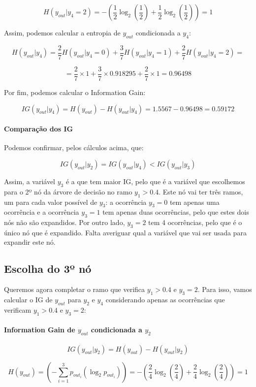 \documentclass{article}
\begin{document}
\[ H(y_{out}|y_4 = 2) = - \left( \frac{1}{2} \log_2 \left( \frac{1}{2} \right) + \frac{1}{2} \log_2 \left( \frac{1}{2} \right) \right) = 1 \]

Assim, podemos calcular a entropia de $y_{out}$ condicionada a $y_4$:

\[ H(y_{out}|y_4) = \frac{2}{7} H(y_{out}|y_4 = 0) + \frac{3}{7} H(y_{out}|y_4 = 1) + \frac{2}{7} H(y_{out}|y_4 = 2) = \]

\[ = \frac{2}{7} \times 1 + \frac{3}{7} \times 0.918295 + \frac{2}{7} \times 1 = 0.96498 \]

Por fim, podemos calcular o Information Gain:

\[ IG(y_{out}|y_4) = H(y_{out}) - H(y_{out}|y_4) = 1.5567 - 0.96498 = 0.59172 \]

\paragraph{Comparação dos IG}

Podemos confirmar, pelos cálculos acima, que:

\[ IG(y_{out}|y_2) = IG(y_{out}|y_4) < IG(y_{out}|y_3) \]

Assim, a variável $y_3$ é a que tem maior IG, pelo que é a variável que escolhemos para o 2º nó da árvore de decisão no ramo $y_1>0.4$.
Este nó vai ter três ramos, um para cada valor possível de $y_3$: a ocorrência $y_3=0$ tem apenas uma ocorrência e a ocorrência $y_3=1$ tem apenas duas ocorrências, pelo que estes dois nós não são expandidos.
Por outro lado, $y_3=2$ tem 4 ocorrências, pelo que é o único nó que é expandido. Falta averiguar qual a variável que vai ser usada para expandir este nó.

\subsection*{Escolha do 3º nó}

Queremos agora completar o ramo que verifica $y_1 > 0.4$ e $y_3 = 2$. Para isso, vamos calcular o IG de $y_{out}$ para $y_2$ e $y_4$ considerando apenas as ocorrências que verificam $y_1 > 0.4$ e $y_3 = 2$:

\paragraph{Information Gain de $y_{out}$ condicionada a $y_2$}

\[ IG(y_{out}|y_2) = H(y_{out}) - H(y_{out}|y_2) \]

\[ H(y_{out}) = \left(- \sum_{i=1}^{3} p_{out_i} (\log_2 p_{out_i})\right) = - \left( \frac{2}{4} \log_2 \left( \frac{2}{4} \right) + \frac{2}{4} \log_2 \left( \frac{2}{4} \right) \right) = 1 \]
\end{document}
